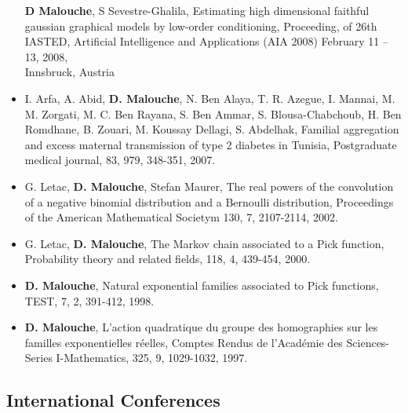 \documentclass[]{article}
\begin{document}
\begin{itemize}
  \textbf{D Malouche}, S Sevestre-Ghalila, Estimating high dimensional
  faithful gaussian graphical models by low-order conditioning,
  Proceeding, of 26th IASTED, Artificial Intelligence and Applications
  (AIA 2008) February 11 -- 13, 2008,\\
  Innsbruck, Austria
\item
  I. Arfa, A. Abid, \textbf{D. Malouche}, N. Ben Alaya, T. R. Azegue, I.
  Mannai, M. M. Zorgati, M. C. Ben Rayana, S. Ben Ammar, S.
  Blousa-Chabchoub, H. Ben Romdhane, B. Zouari, M. Koussay Dellagi, S.
  Abdelhak, Familial aggregation and excess maternal transmission of
  type 2 diabetes in Tunisia, Postgraduate medical journal, 83, 979,
  348-351, 2007.
\item
  G. Letac, \textbf{D. Malouche}, Stefan Maurer, The real powers of the
  convolution of a negative binomial distribution and a Bernoulli
  distribution, Proceedings of the American Mathematical Societym 130,
  7, 2107-2114, 2002.
\item
  G. Letac, \textbf{D. Malouche}, The Markov chain associated to a Pick
  function, Probability theory and related fields, 118, 4, 439-454,
  2000.
\item
  \textbf{D. Malouche}, Natural exponential families associated to Pick
  functions, TEST, 7, 2, 391-412, 1998.
\item
  \textbf{D. Malouche}, L'action quadratique du groupe des homographies
  sur les familles exponentielles réelles, Comptes Rendus de l'Académie
  des Sciences-Series I-Mathematics, 325, 9, 1029-1032, 1997.
\end{itemize}

\subsection{International Conferences}\label{international-conferences}
\end{document}
